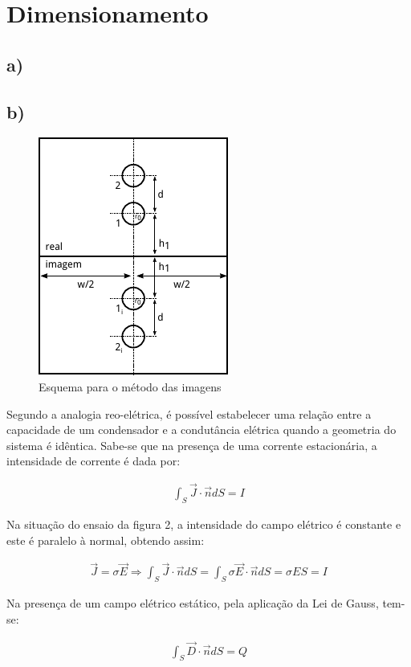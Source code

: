 \documentclass[portuguese, a4paper, fleqn]{article}
\begin{document}
	\section{Dimensionamento}
	\subsection{a)}

	\subsection{b)}
	\begin{figure}[h]
		\centering
		\includegraphics[width=0.4\linewidth]{imagem.pdf}
		\caption{Esquema para o método das imagens}
		\label{fig:imagem}
	\end{figure}
	Segundo a analogia reo-elétrica, é possível estabelecer uma relação entre a capacidade de um condensador e a condutância elétrica quando a geometria do sistema é idêntica.
	Sabe-se que na presença de uma corrente estacionária, a intensidade de corrente é dada por:

	\begin{align*}
		\int _ { S } \vec{J} \cdot \vec{n} d S = I
	\end{align*}

	Na situação do ensaio da figura 2, a intensidade do campo elétrico é constante e este é paralelo à normal, obtendo assim:

	\begin{align*}
		\vec{J} = \sigma \vec{E} \Rightarrow \int _ { S } \vec{J} \cdot \vec{n} d S = \int _ { S } \sigma \vec{E} \cdot \vec{n} d S  = \sigma E S = I
	\end{align*}

	Na presença de um campo elétrico estático, pela aplicação da Lei de Gauss, tem-se:

	\begin{align*}
			\int _ { S } \vec{D} \cdot \vec{n} d S = Q
	\end{align*}
\end{document}
